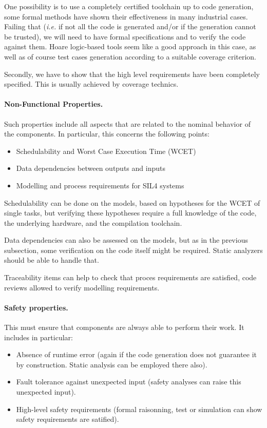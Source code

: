 \documentclass{template/openetcs_article}
\begin{document}
One possibility is to use a completely certified toolchain up
to code generation, some formal methods have shown their effectiveness in many industrial cases. Failing that ({\it i.e.} if not all the code is generated
and/or if the generation cannot be trusted), we will need to have formal
specifications and to verify the code against them. Hoare logic-based tools
seem like a good approach in this case, as well as of course test cases
generation according to a suitable coverage criterion.

Secondly, we have to  show that the high level requirements have been completely specified. This is usually  achieved by coverage technics. 

\paragraph{Non-Functional Properties.}

Such properties include all aspects that are related to the nominal behavior
of the components. In particular, this concerns the following points:
\begin{itemize}
\item Schedulability and Worst Case Execution Time (WCET)
\item Data dependencies between outputs and inputs
\item Modelling and process requirements for SIL4 systems
\end{itemize}

Schedulability can be done on the models, based on hypotheses for the WCET of
single tasks, but verifying these hypotheses require a full knowledge of
the code, the underlying hardware, and the compilation toolchain.

Data dependencies can also be assessed on the models, but as in the previous
subsection, some verification on the code itself might be required. Static
analyzers should be able to handle that.

Traceability  items can help  to  check  that proces requirements are satisfied, code reviews allowed to  verify modelling requirements.

\paragraph{Safety properties.}

This must ensure that components are always able to perform their work.
It includes in particular:
\begin{itemize}
  \item Absence of runtime error (again if the code generation does
        not guarantee it by construction. Static analysis can be employed
        there also).
  \item Fault tolerance against unexpected input (safety analyses can raise this unexpected input).
  \item High-level safety requirements (formal raisonning, test or simulation can show safety requirements are satified).
\end{itemize}
\end{document}

